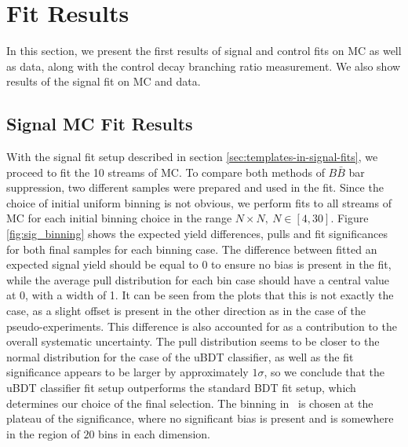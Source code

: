 \section{Fit Results}
In this section, we present the first results of signal and control fits on MC as well as data, along with the control decay branching ratio measurement. We also show results of the signal fit on MC and data.

\subsection{Signal MC Fit Results}\label{sec:signal-mc-fit-results}

With the signal fit setup described in section \ref{sec:templates-in-signal-fits}, we proceed to fit the 10 streams of MC. To compare both methods of $B \bar B$ bar suppression, two different samples were prepared and used in the fit. Since the choice of initial uniform binning is not obvious, we perform fits to all streams of MC for each initial binning choice in the range $N\times N,~N\in[4,30]$. Figure \ref{fig:sig_binning} shows the expected yield differences, pulls and fit significances for both final samples for each binning case. The difference between fitted an expected signal yield should be equal to 0 to ensure no bias is present in the fit, while the average pull distribution for each bin case should have a central value at 0, with a width of 1. It can be seen from the plots that this is not exactly the case, as a slight offset is present in the other direction as in the case of the pseudo-experiments. This difference is also accounted for as a contribution to the overall systematic uncertainty. The pull distribution seems to be closer to the normal distribution for the case of the uBDT classifier, as well as the fit significance appears to be larger by approximately $1\sigma$, so we conclude that the uBDT classifier fit setup outperforms the standard BDT fit setup, which determines our choice of the final selection. The binning in \vars~is chosen at the plateau of the significance, where no significant bias is present and is somewhere in the region of $20$ bins in each dimension.

